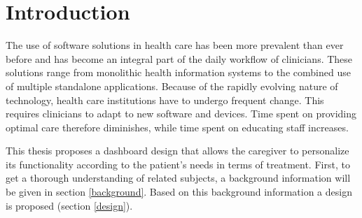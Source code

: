 \section{Introduction}

The use of software solutions in health care has been more prevalent than ever before and has become an integral part of the daily workflow of clinicians. These solutions range from monolithic health information systems to the combined use of multiple standalone applications. Because of the rapidly evolving nature of technology, health care institutions have to undergo frequent change. This requires clinicians to adapt to new software and devices. Time spent on providing optimal care therefore diminishes, while time spent on educating staff increases.



This thesis proposes a dashboard design that allows the caregiver to personalize its functionality according to the patient's needs in terms of treatment. First, to get a thorough understanding of related subjects, a background information will be given in section \ref{background}. Based on this background information a design is proposed (section \ref{design}).